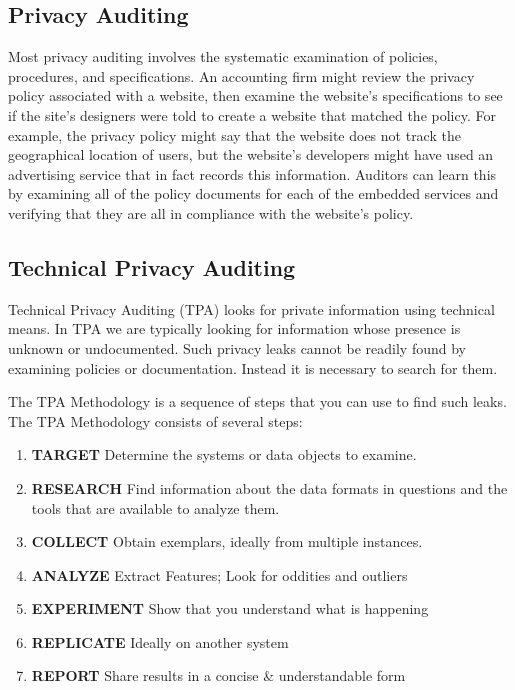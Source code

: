 \subsection{Privacy Auditing \INDEV}

Most privacy auditing involves the systematic examination of policies,
procedures, and specifications. An accounting firm might review the
privacy policy associated with a website, then examine the website's
specifications to see if the site's designers were told to create a
website that matched the policy. For example, the privacy policy might
say that the website does not track the geographical location of
users, but the website's developers might have used an advertising
service that in fact records this information. Auditors can learn this
by examining all of the policy documents for each of the embedded
services and verifying that they are all in compliance with the
website's policy.



\subsection{Technical Privacy Auditing}

Technical Privacy Auditing (TPA) looks for private
information using technical means.  In TPA we are typically looking
for information whose presence is unknown or undocumented. Such
privacy leaks cannot be readily found by examining policies or
documentation. Instead it is necessary to search for them.

The TPA Methodology is a sequence of steps that you can use to find
such leaks. The TPA Methodology consists of several steps:

\begin{enumerate}
\item \textbf{TARGET} Determine the systems or data objects to examine.
\item \textbf{RESEARCH} Find information about the data formats in
  questions and the tools that are available to analyze them. 
\item \textbf{COLLECT} Obtain exemplars, ideally from multiple instances.
\item \textbf{ANALYZE} Extract Features; Look for oddities and outliers
\item \textbf{EXPERIMENT} Show that you understand what is happening
\item \textbf{REPLICATE} Ideally on another system
\item \textbf{REPORT} Share results in a concise \& understandable form
\end{enumerate}

